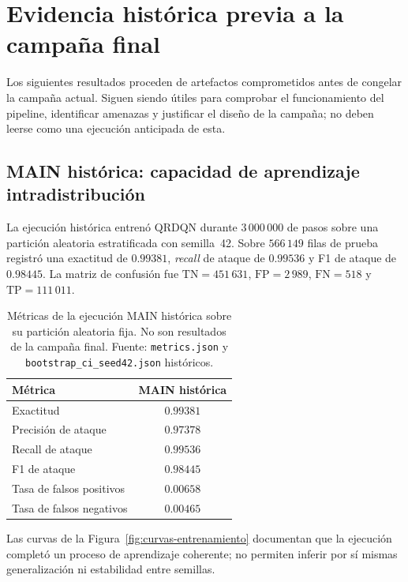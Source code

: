 \section{Evidencia histórica previa a la campaña final}
\label{sec:evidencia-historica}

Los siguientes resultados proceden de artefactos comprometidos antes de congelar la campaña actual. Siguen siendo útiles para comprobar el funcionamiento del pipeline, identificar amenazas y justificar el diseño de la campaña; no deben leerse como una ejecución anticipada de esta.

\subsection{MAIN histórica: capacidad de aprendizaje intradistribución}
\label{sec:resultados-main}

La ejecución histórica  entrenó QRDQN durante $3\,000\,000$ de pasos sobre una partición aleatoria estratificada con semilla~42. Sobre $566\,149$ filas de prueba registró una exactitud de $0.99381$, \emph{recall} de ataque de $0.99536$ y F1 de ataque de $0.98445$. La matriz de confusión fue $\mathrm{TN}=451\,631$, $\mathrm{FP}=2\,989$, $\mathrm{FN}=518$ y $\mathrm{TP}=111\,011$.

\begin{table}[htbp]
\centering
\begin{tabular}{lc}
\toprule
Métrica & MAIN histórica \\
\midrule
Exactitud & $0.99381$ \\
Precisión de ataque & $0.97378$ \\
Recall de ataque & $0.99536$ \\
F1 de ataque & $0.98445$ \\
Tasa de falsos positivos & $0.00658$ \\
Tasa de falsos negativos & $0.00465$ \\
\bottomrule
\end{tabular}
\caption[Métricas de la MAIN histórica]{Métricas de la ejecución MAIN histórica sobre su partición aleatoria fija. No son resultados de la campaña final. Fuente: \texttt{metrics.json} y \texttt{bootstrap\_ci\_seed42.json} históricos.}
\label{tab:main-metrics}
\end{table}

Las curvas de la Figura~\ref{fig:curvas-entrenamiento} documentan que la ejecución completó un proceso de aprendizaje coherente; no permiten inferir por sí mismas generalización ni estabilidad entre semillas.

